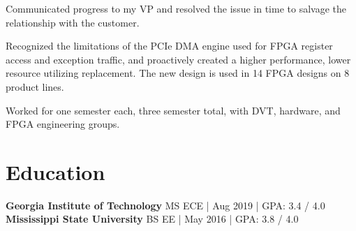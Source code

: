 \documentclass[10pt]{deedy-resume-reversed}
\begin{document}
\begin{minipage}[t]{1.0\textwidth}
\begin{tightemize}
Communicated progress to my VP and resolved the issue in time to salvage the relationship with the customer.
\item Recognized the limitations of the PCIe DMA engine used for FPGA register access and exception traffic,
and proactively created a higher performance, lower resource utilizing replacement. The new design is used in 14 FPGA designs on 8 product lines.
\end{tightemize}
\sectionsep

\begin{tightemize}
\item Worked for one semester each, three semester total, with DVT, hardware, and FPGA engineering groups.
\end{tightemize}
\sectionsep



\section{Education}
\textbf{Georgia Institute of Technology} MS ECE | Aug 2019 | GPA: 3.4 / 4.0 \\
\textbf{Mississippi State University} BS EE | May 2016 | GPA: 3.8 / 4.0 \\
\sectionsep

\end{minipage}
\end{document}
